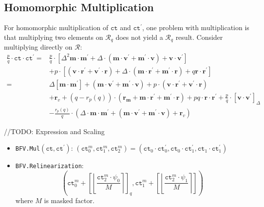 \documentclass[11pt]{article}
\begin{document}
\subsection{Homomorphic Multiplication}
For homomorphic multiplication of $\texttt{ct}$ and $\texttt{ct}^\prime$, one problem with multiplication is that multiplying two elements on $\mathcal{R}_q$ does not yield a $\mathcal{R}_q$ result. Consider multiplying directly on $\mathcal{R}$:
\begin{equation*}
	\label{equation:mul}
	\begin{aligned}
	\frac{p}{q}\cdot\texttt{ct}\cdot\texttt{ct}^\prime=&\frac{p}{q}\cdot\left[\Delta^2\mathbf{m}\cdot\mathbf{m}^\prime+\Delta\cdot(\mathbf{m}\cdot\mathbf{v}^\prime+\mathbf{m}^\prime\cdot\mathbf{v})+\mathbf{v}\cdot\mathbf{v}^\prime\right]&\\
	& +p\cdot\left[(\mathbf{v}\cdot\mathbf{r}^\prime+\mathbf{v}^\prime\cdot\mathbf{r})+\Delta\cdot(\mathbf{m}\cdot\mathbf{r}^\prime+\mathbf{m}^\prime\cdot\mathbf{r})+q\mathbf{r}\cdot\mathbf{r}^\prime\right]&\\
	=&\Delta[\mathbf{m}\cdot\mathbf{m}^\prime]+(\mathbf{m}\cdot\mathbf{v}^\prime+\mathbf{m}^\prime\cdot\mathbf{v})+p\cdot(\mathbf{v}\cdot\mathbf{r}^\prime+\mathbf{v}^\prime\cdot\mathbf{r})&\\
	& +\mathbf{r}_v+(q-r_p(q))\cdot(\mathbf{r_m}+\mathbf{m}\cdot\mathbf{r}^\prime+\mathbf{m}^\prime\cdot\mathbf{r})+pq\cdot\mathbf{r}\cdot\mathbf{r}^\prime+\frac{p}{q}\cdot[\mathbf{v}\cdot\mathbf{v}^\prime]_\Delta&\\
	& -\frac{r_p(q)}{q}\cdot(\Delta\cdot\mathbf{m}\cdot\mathbf{m}^\prime+(\mathbf{m}\cdot\mathbf{v}^\prime+\mathbf{m}^\prime\cdot\mathbf{v})+\mathbf{r}_v)&
\end{aligned}
\end{equation*}

//TODO: Expression and Scaling
\begin{itemize}
\item \texttt{BFV.Mul}$(\texttt{ct},\texttt{ct}^\prime)$: $(\texttt{ct}^m_0,\texttt{ct}^m_1,\texttt{ct}^m_2) = (\texttt{ct}_0 \cdot \texttt{ct}^\prime_0, \texttt{ct}_0 \cdot \texttt{ct}^\prime_1, \texttt{ct}_1 \cdot \texttt{ct}^\prime_1)$
\item \texttt{BFV.Relinearization}:	$$(\texttt{ct}^m_0+\left[\left\lfloor\frac{\texttt{ct}^m_2\cdot\psi_0}{M}\right\rceil\right]_q,\texttt{ct}^m_1+\left[\left\lfloor\frac{\texttt{ct}^m_2\cdot\psi_1}{M}\right\rceil\right])$$ where $M$ is masked factor.
\end{itemize}


\end{document}
